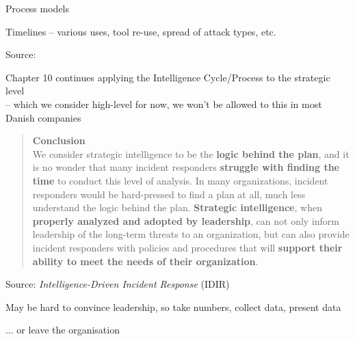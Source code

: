 \documentclass[Screen16to9,17pt]{foils}
\begin{document}

\begin{list2}
\item Process models
\item Timelines -- various uses, tool re-use, spread of attack types, etc.
\end{list2}


Source: 

\begin{list2}
\item Chapter 10 continues applying the Intelligence Cycle/Process to the strategic level \\
-- which we consider high-level for now, we won't be allowed to this in most Danish companies
\end{list2}



\begin{quote}
{\Large\bf Conclusion}\\
We consider strategic intelligence to be the {\bf logic behind the plan}, and it is no wonder that many incident responders {\bf struggle with finding the time} to conduct this level of analysis. In many organizations, incident responders would be hard-pressed to find a plan at all, much less understand the logic behind the plan. {\bf Strategic intelligence}, when {\bf properly analyzed and adopted by leadership}, can not only inform leadership of the long-term threats to an organization, but can also provide incident responders with policies and procedures that will {\bf support their ability to meet the needs of their organization}.
\end{quote}
Source: \emph{Intelligence-Driven Incident Response} (IDIR)

\begin{list2}
\item May be hard to convince leadership, so take numbers, collect data, present data
\item ... or leave the organisation
\end{list2}



\end{document}
